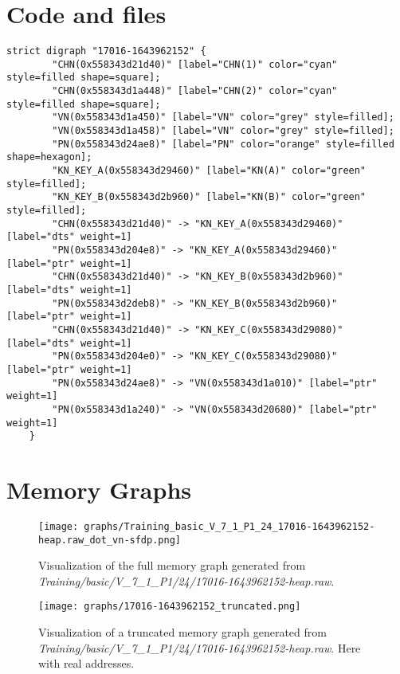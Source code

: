 \section{Code and files}

\begin{lstlisting}[style=text, caption={The DOT file of uncompressed block memgraph, here \textit{Training/basic/V\_7\_1\_P1/24/17016-1643962152-heap.raw}, with real addresses. Output is cropped.}, label={appendix:dot:17016-1643962152:cropped}]
    strict digraph "17016-1643962152" {
        "CHN(0x558343d21d40)" [label="CHN(1)" color="cyan" style=filled shape=square];
        "CHN(0x558343d1a448)" [label="CHN(2)" color="cyan" style=filled shape=square];
        "VN(0x558343d1a450)" [label="VN" color="grey" style=filled];
        "VN(0x558343d1a458)" [label="VN" color="grey" style=filled];
        "PN(0x558343d24ae8)" [label="PN" color="orange" style=filled shape=hexagon];
        "KN_KEY_A(0x558343d29460)" [label="KN(A)" color="green" style=filled];
        "KN_KEY_B(0x558343d2b960)" [label="KN(B)" color="green" style=filled];
        "CHN(0x558343d21d40)" -> "KN_KEY_A(0x558343d29460)" [label="dts" weight=1]
        "PN(0x558343d204e8)" -> "KN_KEY_A(0x558343d29460)" [label="ptr" weight=1]
        "CHN(0x558343d21d40)" -> "KN_KEY_B(0x558343d2b960)" [label="dts" weight=1]
        "PN(0x558343d2deb8)" -> "KN_KEY_B(0x558343d2b960)" [label="ptr" weight=1]
        "CHN(0x558343d21d40)" -> "KN_KEY_C(0x558343d29080)" [label="dts" weight=1]
        "PN(0x558343d204e0)" -> "KN_KEY_C(0x558343d29080)" [label="ptr" weight=1]
        "PN(0x558343d24ae8)" -> "VN(0x558343d1a010)" [label="ptr" weight=1]
        "PN(0x558343d1a240)" -> "VN(0x558343d20680)" [label="ptr" weight=1]
    }
\end{lstlisting}

\section{Memory Graphs}

\begin{figure}[H]\label{appendix:mem_graph:17016-1643962152:full}
    \centering
    \texttt{[image: graphs/Training\_basic\_V\_7\_1\_P1\_24\_17016-1643962152-heap.raw\_dot\_vn-sfdp.png]}
    \caption{Visualization of the full memory graph generated from \textit{Training/basic/V\_7\_1\_P1/24/17016-1643962152-heap.raw}.}
\end{figure}

\begin{figure}[H]\label{appendix:mem_graph:17016-1643962152:truncated}
    \centering
    \texttt{[image: graphs/17016-1643962152\_truncated.png]}
    \caption{Visualization of a truncated memory graph generated from \textit{Training/basic/V\_7\_1\_P1/24/17016-1643962152-heap.raw}. Here with real addresses.}
\end{figure}

